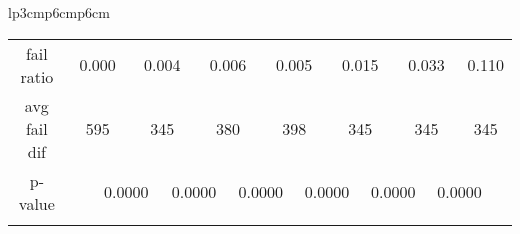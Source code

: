 {\begin{tabular}{lp{3cm}p{6cm}p{6cm}}
\begin{tabular}[h]{m{2.5cm}m{}m{}m{}m{}m{}m{}m{}m{}m{}m{}m{}m{}m{}m{}}
\hline
\multicolumn{1}{c}{fail ratio}&\multicolumn{2}{c}{          0.000}&\multicolumn{2}{c}{    0.004}&\multicolumn{2}{c}{    0.006}&\multicolumn{2}{c}{    0.005}&\multicolumn{2}{c}{    0.015}&\multicolumn{2}{c}{    0.033}&\multicolumn{2}{c}{    0.110}\\
\multicolumn{1}{c}{avg fail dif}&\multicolumn{2}{c}{          595}&\multicolumn{2}{c}{      345}&\multicolumn{2}{c}{      380}&\multicolumn{2}{c}{      398}&\multicolumn{2}{c}{      345}&\multicolumn{2}{c}{      345}&\multicolumn{2}{c}{      345}\\
\hline
\multicolumn{1}{c}{p-value}&&\multicolumn{2}{c}{0.0000}&\multicolumn{2}{c}{0.0000}&\multicolumn{2}{c}{0.0000}&\multicolumn{2}{c}{0.0000}&\multicolumn{2}{c}{0.0000}&\multicolumn{2}{c}{0.0000}\\
&&&&&&&&&&&&&&\end{tabular}
\end{tabular}
}

